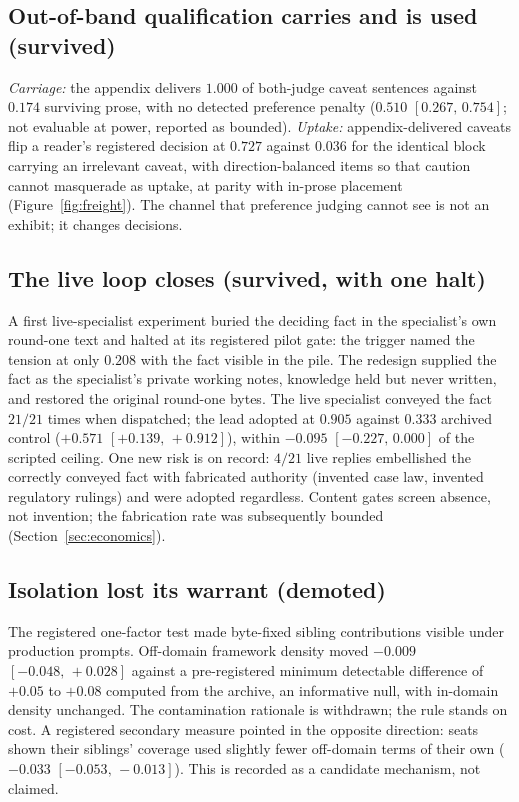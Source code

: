 \documentclass[11pt]{article}
\newcommand{\ci}[2]{\ensuremath{[#1,\,#2]}}
\begin{document}
\subsection{Out-of-band qualification carries and is used (survived)}

\emph{Carriage:} the appendix delivers $1.000$ of both-judge caveat
sentences against $0.174$ surviving prose, with no detected preference
penalty ($0.510$ \ci{0.267}{0.754}; not evaluable at power, reported
as bounded). \emph{Uptake:} appendix-delivered caveats flip a reader's
registered decision at $0.727$ against $0.036$ for the identical block
carrying an irrelevant caveat, with direction-balanced items so that
caution cannot masquerade as uptake, at parity with in-prose placement
(Figure~\ref{fig:freight}). The channel that preference judging cannot
see is not an exhibit; it changes decisions.

\subsection{The live loop closes (survived, with one halt)}

A first live-specialist experiment buried the deciding fact in the
specialist's own round-one text and halted at its registered pilot
gate: the trigger named the tension at only $0.208$ with the fact
visible in the pile. The redesign supplied the fact as the specialist's
private working notes, knowledge held but never written, and restored
the original round-one bytes. The live specialist conveyed the fact
$21/21$ times when dispatched; the lead adopted at $0.905$ against
$0.333$ archived control ($+0.571$ \ci{+0.139}{+0.912}), within
$-0.095$ \ci{-0.227}{0.000} of the scripted ceiling. One new risk is on
record: $4/21$ live replies embellished the correctly conveyed fact
with fabricated authority (invented case law, invented regulatory
rulings) and were adopted regardless. Content gates screen absence, not
invention; the fabrication rate was subsequently bounded
(Section~\ref{sec:economics}).

\subsection{Isolation lost its warrant (demoted)}

The registered one-factor test made byte-fixed sibling contributions
visible under production prompts. Off-domain framework density moved
$-0.009$ \ci{-0.048}{+0.028} against a pre-registered minimum
detectable difference of $+0.05$ to $+0.08$ computed from the archive,
an informative null, with in-domain density unchanged. The
contamination rationale is withdrawn; the rule stands on cost. A
registered secondary measure pointed in the opposite direction: seats
shown their siblings' coverage used slightly fewer off-domain terms of
their own ($-0.033$ \ci{-0.053}{-0.013}). This is recorded as a
candidate mechanism, not claimed.
\end{document}
